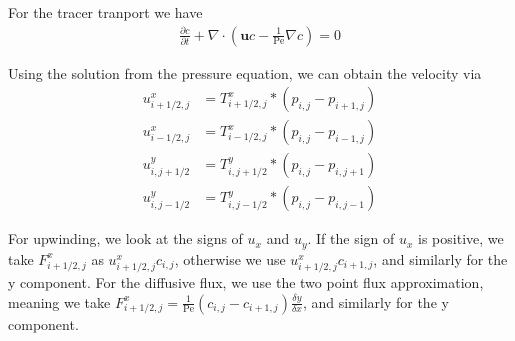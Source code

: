 \documentclass{article}
\begin{document}
For the tracer tranport we have
\begin{align}
\frac{\partial c}{\partial t} + \nabla \cdot (\mathbf{u}c - \frac{1}{\mathrm{Pe}} \nabla c) = 0
\end{align}

Using the solution from the pressure equation, we can obtain the velocity via
\begin{align}
    u^x_{i+1/2, j} &= T^x_{i+1/2,j}*(p_{i,j} - p_{i+1,j}) \\
    u^x_{i-1/2, j} &= T^x_{i-1/2,j}*(p_{i,j} - p_{i-1,j}) \\
    u^y_{i, j+1/2} &= T^y_{i,j+1/2}*(p_{i,j} - p_{i,j+1}) \\
    u^y_{i, j-1/2} &= T^y_{i,j-1/2}*(p_{i,j} - p_{i,j-1})
\end{align}

For upwinding, we look at the signs of $u_x$ and $u_y$.
If the sign of $u_x$ is positive, we take $F^x_{i+1/2,j}$ as $u^x_{i+1/2,j}c_{i,j}$, otherwise we use $u^x_{i+1/2,j}c_{i+1,j}$, and similarly for the y component.
For the diffusive flux, we use the two point flux approximation, meaning we take
$F^x_{i+1/2,j} = \frac{1}{\mathrm{Pe}} (c_{i,j} - c_{i+1,j}) \frac{\delta y}{\delta x}$, and similarly for the y component.
\end{document}
